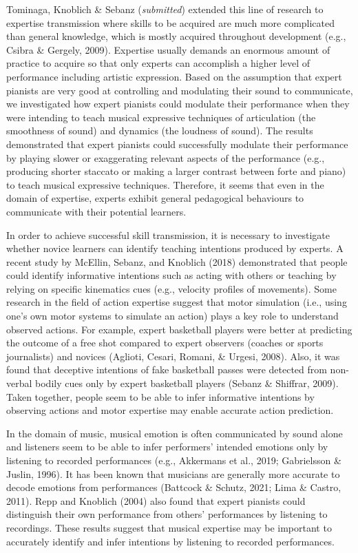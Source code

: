 \documentclass[
  man,floatsintext]{apa6}
\begin{document}
Tominaga, Knoblich \& Sebanz (\emph{submitted}) extended this line of research to expertise transmission where skills to be acquired are much more complicated than general knowledge, which is mostly acquired throughout development (e.g., Csibra \& Gergely, 2009). Expertise usually demands an enormous amount of practice to acquire so that only experts can accomplish a higher level of performance including artistic expression. Based on the assumption that expert pianists are very good at controlling and modulating their sound to communicate, we investigated how expert pianists could modulate their performance when they were intending to teach musical expressive techniques of articulation (the smoothness of sound) and dynamics (the loudness of sound). The results demonstrated that expert pianists could successfully modulate their performance by playing slower or exaggerating relevant aspects of the performance (e.g., producing shorter staccato or making a larger contrast between forte and piano) to teach musical expressive techniques. Therefore, it seems that even in the domain of expertise, experts exhibit general pedagogical behaviours to communicate with their potential learners.

In order to achieve successful skill transmission, it is necessary to investigate whether novice learners can identify teaching intentions produced by experts. A recent study by McEllin, Sebanz, and Knoblich (2018) demonstrated that people could identify informative intentions such as acting with others or teaching by relying on specific kinematics cues (e.g., velocity profiles of movements). Some research in the field of action expertise suggest that motor simulation (i.e., using one's own motor systems to simulate an action) plays a key role to understand observed actions. For example, expert basketball players were better at predicting the outcome of a free shot compared to expert observers (coaches or sports journalists) and novices (Aglioti, Cesari, Romani, \& Urgesi, 2008). Also, it was found that deceptive intentions of fake basketball passes were detected from non-verbal bodily cues only by expert basketball players (Sebanz \& Shiffrar, 2009). Taken together, people seem to be able to infer informative intentions by observing actions and motor expertise may enable accurate action prediction.

In the domain of music, musical emotion is often communicated by sound alone and listeners seem to be able to infer performers' intended emotions only by listening to recorded performances (e.g., Akkermans et al., 2019; Gabrielsson \& Juslin, 1996). It has been known that musicians are generally more accurate to decode emotions from performances (Battcock \& Schutz, 2021; Lima \& Castro, 2011). Repp and Knoblich (2004) also found that expert pianists could distinguish their own performance from others' performances by listening to recordings. These results suggest that musical expertise may be important to accurately identify and infer intentions by listening to recorded performances.
\end{document}
